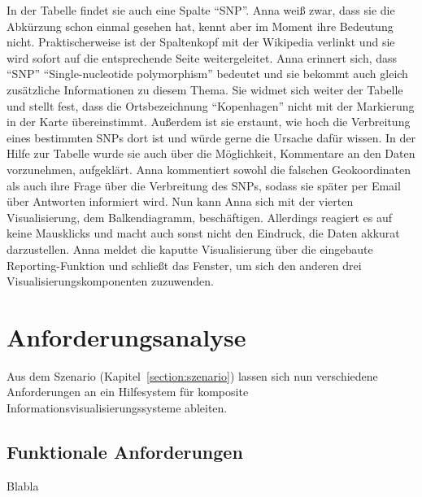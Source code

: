 \documentclass[
	headsepline,
	footsepline,
	fontsize=12pt,
	bibliography=totoc
]{scrbook}
\begin{document}

In der Tabelle findet sie auch eine Spalte \enquote{SNP}. Anna weiß zwar, dass sie die Abkürzung schon einmal gesehen hat, kennt aber im Moment ihre Bedeutung nicht. Praktischerweise ist der Spaltenkopf mit der Wikipedia verlinkt und sie wird sofort auf die entsprechende Seite weitergeleitet. Anna erinnert sich, dass \enquote{SNP} \enquote{Single-nucleotide polymorphism} bedeutet und sie bekommt auch gleich zusätzliche Informationen zu diesem Thema. Sie widmet sich weiter der Tabelle und stellt fest, dass die Ortsbezeichnung \enquote{Kopenhagen} nicht mit der Markierung in der Karte übereinstimmt. Außerdem ist sie erstaunt, wie hoch die Verbreitung eines bestimmten SNPs dort ist und würde gerne die Ursache dafür wissen. In der Hilfe zur Tabelle wurde sie auch über die Möglichkeit, Kommentare an den Daten vorzunehmen, aufgeklärt. Anna kommentiert sowohl die falschen Geokoordinaten als auch ihre Frage über die Verbreitung des SNPs, sodass sie später per Email über Antworten informiert wird. Nun kann Anna sich mit der vierten Visualisierung, dem Balkendiagramm, beschäftigen. Allerdings reagiert es auf keine Mausklicks und macht auch sonst nicht den Eindruck, die Daten akkurat darzustellen. Anna meldet die kaputte Visualisierung über die eingebaute Reporting-Funktion und schließt das Fenster, um sich den anderen drei Visualisierungskomponenten zuzuwenden.

\section{Anforderungsanalyse}
\label{section:anforderungsanalyse}

Aus dem Szenario (Kapitel~\ref{section:szenario}) lassen sich nun verschiedene Anforderungen an ein Hilfesystem für komposite Informationsvisualisierungssysteme ableiten.

\subsection{Funktionale Anforderungen}
\label{section:funktionale_anforderungen}

Blabla
\end{document}
